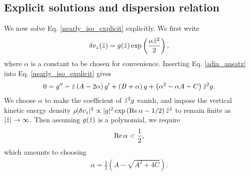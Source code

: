 \subsection{Explicit solutions and dispersion relation}\label{disp_relax}
We now solve Eq. \ref{nearly_iso_explicit} explicitly. We first write  
\begin{align}
  \delta v_z(\hat{z}) =
  g(\hat{z})\exp\left(\frac{\alpha\hat{z}^2}{2}\right), \label{adia_ansatz}
\end{align}
where $\alpha$ is a constant to be chosen for convenience. Inserting
Eq. \ref{adia_ansatz} into Eq. \ref{nearly_iso_explicit} gives
\begin{align}
  0 = g^{\prime\prime} - \hat{z}\left(A - 2\alpha\right)g^\prime + \left(B +
    \alpha\right)g
  +\left(\alpha^2 - \alpha A - C\right)\hat{z}^2 g.
\end{align}
We choose $\alpha$ to make the coefficient of $\hat{z}^2g$
vanish, and impose the vertical kinetic energy density
$\rho|\delta v_z|^2\propto |g|^2 \exp{\left(\operatorname{Re}\alpha -
    1/2\right)\hat{z}^2}$ to remain finite as $|\hat{z}|\to\infty$. 
Then assuming $g(\hat{z})$ is a polynomial, we require  
\begin{align}
  \operatorname{Re}\alpha < \frac{1}{2}, 
\end{align}
which amounts to choosing 
\begin{align}
  \alpha = \frac{1}{2}\left(A - \sqrt{A^2 + 4C}\right).  
\end{align} 

